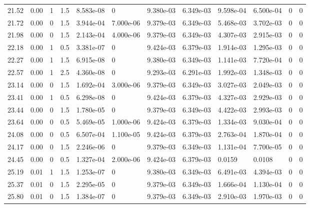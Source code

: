 \documentclass[preview]{standalone}
\begin{document}
{{{\begin{tabular}{L{1.2cm}C{1.2cm} C{0.3cm}C{0.5cm} C{1.4cm}C{1.4cm} C{1.4cm}C{1.4cm} C{1.6cm}C{1.6cm} C{1.6cm}C{1.6cm}}
  21.52  &  0.00  & 1     & 1.5 &  8.583e-08  & 0  &  9.380e-03&   6.349e-03& 9.598e-04 & 6.500e-04   &  0 & 0  \\ 
  21.72  &  0.00  & 0     & 1.5 &  3.944e-04  & 7.000e-06  &  9.379e-03&   6.349e-03& 5.468e-03 & 3.702e-03   &  0 & 0  \\ 
  21.98  &  0.00  & 0     & 1.5 &  2.143e-04  & 4.000e-06  &  9.379e-03&   6.349e-03& 4.307e-03 & 2.915e-03   &  0 & 0  \\ 
  22.18  &  0.00  & 1     & 0.5 &  3.381e-07  & 0  &  9.424e-03&   6.379e-03& 1.914e-03 & 1.295e-03   &  0 & 0  \\ 
  22.27  &  0.00  & 1     & 1.5 &  6.915e-08  & 0  &  9.380e-03&   6.349e-03& 1.141e-03 & 7.720e-04   &  0 & 0  \\ 
  22.57  &  0.00  & 1     & 2.5 &  4.360e-08  & 0  &  9.293e-03&   6.291e-03& 1.992e-03 & 1.348e-03   &  0 & 0  \\ 
  23.14  &  0.00  & 0     & 1.5 &  1.692e-04  & 3.000e-06  &  9.379e-03&   6.349e-03& 3.027e-03 & 2.049e-03   &  0 & 0  \\ 
  23.41  &  0.00  & 1     & 0.5 &  6.298e-08  & 0  &  9.424e-03&   6.379e-03& 4.327e-03 & 2.929e-03   &  0 & 0  \\ 
  23.44  &  0.00  & 0     & 1.5 &  1.780e-05  & 0  &  9.379e-03&   6.349e-03& 4.422e-03 & 2.993e-03   &  0 & 0  \\ 
  23.64  &  0.00  & 0     & 0.5 &  5.469e-05  & 1.000e-06  &  9.424e-03&   6.379e-03& 1.334e-03 & 9.030e-04   &  0 & 0  \\ 
  24.08  &  0.00  & 0     & 0.5 &  6.507e-04  & 1.100e-05  &  9.424e-03&   6.379e-03& 2.763e-04 & 1.870e-04   &  0 & 0  \\ 
  24.17  &  0.00  & 0     & 1.5 &  2.246e-06  & 0  &  9.379e-03&   6.349e-03& 1.131e-04 & 7.700e-05   &  0 & 0  \\ 
  24.45  &  0.00  & 0     & 0.5 &  1.327e-04  & 2.000e-06  &  9.424e-03&   6.379e-03& 0.0159 & 0.0108   &  0 & 0  \\ 
  25.19  &  0.01  & 1     & 1.5 &  1.253e-07  & 0  &  9.380e-03&   6.349e-03& 6.491e-03 & 4.394e-03   &  0 & 0  \\ 
  25.37  &  0.01  & 0     & 1.5 &  2.295e-05  & 0  &  9.379e-03&   6.349e-03& 1.666e-04 & 1.130e-04   &  0 & 0  \\ 
  25.80  &  0.01  & 0     & 1.5 &  1.384e-07  & 0  &  9.379e-03&   6.349e-03& 2.910e-03 & 1.970e-03   &  0 & 0  \\ 
\hline 
\end{tabular} 

}}}
\end{document}
